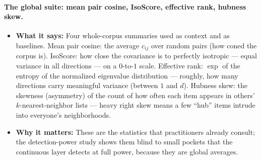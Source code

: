 \documentclass[11pt,letterpaper]{article}
\begin{document}
\paragraph{The global suite: mean pair cosine, IsoScore, effective rank,
hubness skew.}
\begin{itemize}
  \item \textbf{What it says:} Four whole-corpus summaries used as context
  and as baselines. Mean pair cosine: the average $c_{ij}$ over random
  pairs (how coned the corpus is). IsoScore: how close the covariance is to
  perfectly isotropic --- equal variance in all directions --- on a
  $0$-to-$1$ scale. Effective rank: $\exp$ of the entropy of the
  normalized eigenvalue distribution --- roughly, how many directions carry
  meaningful variance (between $1$ and $d$). Hubness skew: the skewness
  (asymmetry) of the count of how often each item appears in others'
  $k$-nearest-neighbor lists --- heavy right skew means a few ``hub'' items
  intrude into everyone's neighborhoods.
  \item \textbf{Why it matters:} These are the statistics that practitioners
  already consult; the detection-power study shows them blind to small
  pockets that the continuous layer detects at full power, because they
  are global averages.
\end{itemize}
\end{document}
